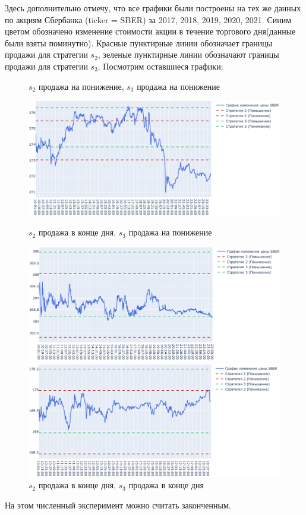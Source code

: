 Здесь дополнительно отмечу, что все графики были построены на тех же данных по акциям Сбербанка (ticker = SBER) за 2017, 2018, 2019, 2020, 2021. Синим цветом обозначено изменение стоимости акции в течение торгового дня(данные были взяты поминутно). Красные пунктирные линии обозначает границы продажи для стратегии $s_2$, зеленые пунктирные линии обозначают границы продажи для стратегии $s_3$. Посмотрим оставшиеся графики:

\begin{center}
    \begin{figure}[h]
        \centering
        \caption{$s_2$ продажа на понижение, $s_3$ продажа на понижение}
        \includegraphics[keepaspectratio=true,scale=0.35]{images/chapter3/downdown.png}
        
        \caption{$s_2$ продажа в конце дня, $s_3$ продажа на понижение}
        \includegraphics[keepaspectratio=true,scale=0.35]{images/chapter3/zerodown.png}
        
        \caption{$s_2$ продажа в конце дня, $s_3$ продажа в конце дня}
        \includegraphics[keepaspectratio=true,scale=0.35]{images/chapter3/zerozero.png}
    \end{figure}
\end{center}


На этом численный эксперимент можно считать законченным. 

